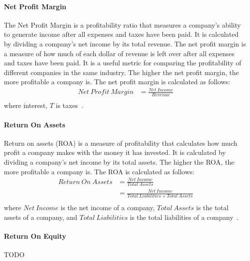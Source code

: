 \documentclass[../xlapes02]{subfiles}
\begin{document}
    \paragraph{Net Profit Margin}\label{par:net-profit-margin}
    The Net Profit Margin is a profitability ratio that measures a company's ability to generate income after all expenses and taxes have been paid. It is calculated by dividing a company's net income by its total revenue. The net profit margin is a measure of how much of each dollar of revenue is left over after all expenses and taxes have been paid. It is a useful metric for comparing the profitability of different companies in the same industry. The higher the net profit margin, the more profitable a company is. The net profit margin is calculated as follows:
    \begin{equation}
        \begin{split}
            Net\ Profit\ Margin&=\frac{Net\ Income}{Revenue}\\
        \end{split}
    \end{equation}
    where interest, $T$ is taxes~\cite{investopedia-net-profit-margin}.

    \paragraph{Return On Assets}\label{par:return-on-assets}
    Return on assets (ROA) is a measure of profitability that calculates how much profit a company makes with the money it has invested. It is calculated by dividing a company's net income by its total assets. The higher the ROA, the more profitable a company is. The ROA is calculated as follows:
    \begin{equation}
        \begin{split}
            Return\ On\ Assets&=\frac{Net\ Income}{Total\ Assets}\\
            &=\frac{Net\ Income}{Total\ Liabilities+Total\ Assets}\\
        \end{split}
    \end{equation}
    where $Net\ Income$ is the net income of a company, $Total\ Assets$ is the total assets of a company, and $Total\ Liabilities$ is the total liabilities of a company~\cite{investopedia-return-on-assets}.

    \paragraph{Return On Equity}\label{par:return-on-equity}
    TODO
\end{document}

